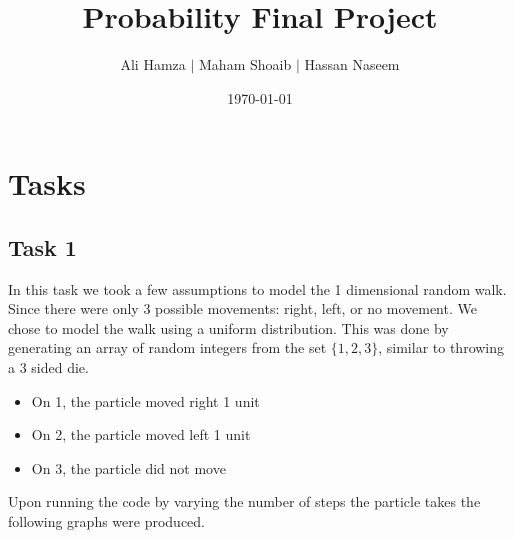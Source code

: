 \documentclass{article}
\title{Probability Final Project}
\author{Ali Hamza $|$ Maham Shoaib $|$ Hassan Naseem}
\date{\today}
\begin{document}
\maketitle

\section{Tasks}
\subsection{Task 1}
In this task we took a few assumptions to model the 1 dimensional random walk. Since there 
were only 3 possible movements: right, left, or no movement. We chose to model the walk using a 
uniform distribution. This was done by generating an array of random integers from the set $\{1,2,3\}$, similar to 
throwing a 3 sided die.
\begin{itemize}
    \item On 1, the particle moved right 1 unit
    \item On 2, the particle moved left 1 unit
    \item On 3, the particle did not move
\end{itemize}
Upon running the code by varying the number of steps the particle takes the following graphs
were produced.
\end{document}
